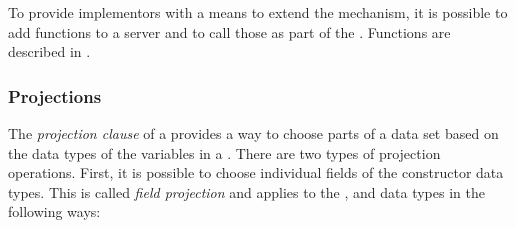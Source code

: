 \documentclass[justify]{nasa-ese}
\renewcommand{\new}[1]{\emph{#1}}
\begin{document}
To provide implementors with a means to extend the \CE mechanism, it is
possible to add functions to a server and to call those as part of the \CE.
Functions are described in .

\subsubsection{Projections}
\label{sec-ce-projections}


The \new{projection clause} of a \CE provides a way to choose parts of
a data set based on the data types of the variables in a \Dataset.
There are two types of projection operations. First, it is possible to
choose individual fields of the constructor data types. This is called
\new{field projection} and applies to the \Structure, \Grid and
\Sequence data types in the following ways:
\end{document}
